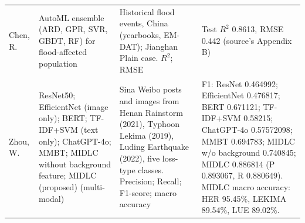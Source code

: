 \begin{longtable}{@{}L{2.0cm}L{3.6cm}L{3.6cm}L{5.4cm}@{}}
Chen, R. \cite{Chen2026FloodHumanitarianDataDriven} & AutoML ensemble (ARD, GPR, SVR, GBDT, RF) for flood-affected population & Historical flood events, China (yearbooks, EM-DAT); Jianghan Plain case. $R^2$; RMSE & Test $R^2$ 0.8613, RMSE 0.442 (source's Appendix B) \\[2pt]
Zhou, W. \cite{Zhou2025ClassificationSeverityDisasterLosses} & ResNet50; EfficientNet (image only); BERT; TF-IDF+SVM (text only); ChatGPT-4o; MMBT; MIDLC without background feature; MIDLC (proposed) (multi-modal) & Sina Weibo posts and images from Henan Rainstorm (2021), Typhoon Lekima (2019), Luding Earthquake (2022), five loss-type classes. Precision; Recall; F1-score; macro accuracy & F1: ResNet 0.464992; EfficientNet 0.476817; BERT 0.671121; TF-IDF+SVM 0.58215; ChatGPT-4o 0.57572098; MMBT 0.694783; MIDLC w/o background 0.740845; MIDLC 0.886814 (P 0.893067, R 0.880649). MIDLC macro accuracy: HER 95.45\%, LEKIMA 89.54\%, LUE 89.02\%. \\[2pt]
\end{longtable}
\endgroup
